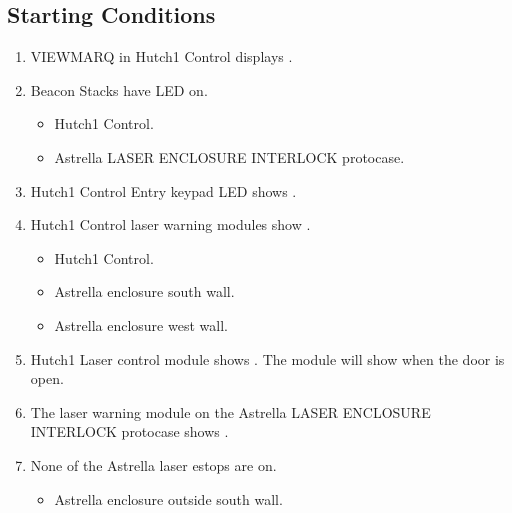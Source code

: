 \documentclass[letterpaper,10pt,english]{sphinxmanual}
\begin{document}
\subsection{Starting Conditions}
\label{\detokenize{testing_documentation/Hutch-1_laser:starting-conditions}}\begin{enumerate}
%
\item {} 
\sphinxAtStartPar
VIEWMARQ in Hutch\sphinxhyphen{}1 Control displays .

\item {} 
\sphinxAtStartPar
Beacon Stacks have  LED on.
\begin{itemize}
\item {} 
\sphinxAtStartPar
Hutch\sphinxhyphen{}1 Control.

\item {} 
\sphinxAtStartPar
Astrella LASER ENCLOSURE INTERLOCK protocase.

\end{itemize}

\item {} 
\sphinxAtStartPar
Hutch\sphinxhyphen{}1 Control Entry keypad LED shows .

\item {} 
\sphinxAtStartPar
Hutch\sphinxhyphen{}1 Control laser warning modules show .
\begin{itemize}
\item {} 
\sphinxAtStartPar
Hutch\sphinxhyphen{}1 Control.

\item {} 
\sphinxAtStartPar
Astrella enclosure south wall.

\item {} 
\sphinxAtStartPar
Astrella enclosure west wall.

\end{itemize}

\item {} 
\sphinxAtStartPar
Hutch\sphinxhyphen{}1 Laser control module shows .
The module will show  when the door is open.

\item {} 
\sphinxAtStartPar
The laser warning module on the Astrella LASER ENCLOSURE INTERLOCK protocase shows .

\item {} 
\sphinxAtStartPar
None of the Astrella laser e\sphinxhyphen{}stops are on.
\begin{itemize}
\item {} 
\sphinxAtStartPar
Astrella enclosure outside south wall.


\end{itemize}
\end{enumerate}
\end{document}
